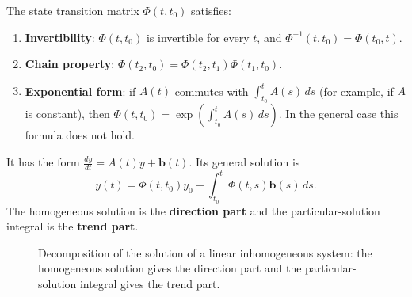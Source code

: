 \begin{property}\label{prop:stm_properties}
The state transition matrix $\Phi(t, t_0)$ satisfies:
\begin{enumerate}[label=(\roman*)]
    \item \textbf{Invertibility}: $\Phi(t, t_0)$ is invertible for every $t$, and $\Phi^{-1}(t, t_0) = \Phi(t_0, t)$.
    \item \textbf{Chain property}: $\Phi(t_2, t_0) = \Phi(t_2, t_1)\Phi(t_1, t_0)$.
    \item \textbf{Exponential form}: if $A(t)$ commutes with $\int_{t_0}^t A(s)\,ds$ (for example, if $A$ is constant), then $\Phi(t, t_0) = \exp\left(\int_{t_0}^t A(s)\,ds\right)$. In the general case this formula does not hold.
\end{enumerate}
\end{property}

\begin{definition}\label{def:linear_inhomogeneous_ode}
It has the form $\frac{dy}{dt} = A(t) y + \mathbf{b}(t)$. Its general solution is
\[
y(t) = \Phi(t, t_0) y_0 + \int_{t_0}^t \Phi(t, s) \mathbf{b}(s)\,ds.
\]
The homogeneous solution is the \textbf{direction part} and the particular-solution integral is the \textbf{trend part}.
\end{definition}

\begin{figure}[htbp]
\centering
{}
\caption{Decomposition of the solution of a linear inhomogeneous system: the homogeneous solution gives the direction part and the particular-solution integral gives the trend part.}
\label{fig:linear_ode_decomposition}
\end{figure}

